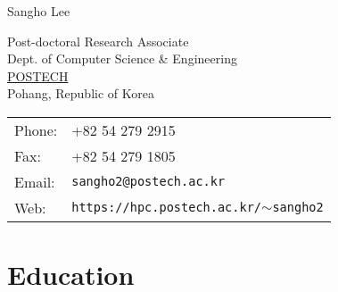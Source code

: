 \documentclass[letterpaper]{article}
\def\name{Sangho Lee}
\begin{document}
{\huge \name}


\vspace{0.25in}

\begin{minipage}{0.5\linewidth}
  Post-doctoral Research Associate \\
  Dept. of Computer Science \& Engineering \\
  \href{http://www.postech.ac.kr}{POSTECH} \\  
  Pohang, Republic of Korea
\end{minipage}
\begin{minipage}{0.5\linewidth}
  \begin{tabular}{ll}
    Phone:    & +82 54 279 2915 \\
    Fax:      & +82 54 279 1805 \\
    Email:    & {\tt sangho2@postech.ac.kr} \\
    Web: & {\tt https://hpc.postech.ac.kr/$\sim$sangho2} \\
  \end{tabular}
\end{minipage}

\section*{Education}
\end{document}
